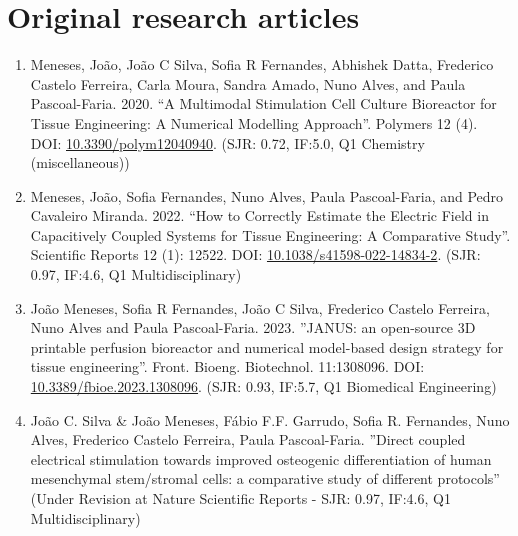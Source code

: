 \section{Original research articles}
\begin{enumerate}
\item \small Meneses, João, João C Silva, Sofia R Fernandes, Abhishek Datta, Frederico Castelo Ferreira, Carla Moura, Sandra Amado, Nuno Alves, and Paula Pascoal-Faria. 2020. “A Multimodal Stimulation Cell Culture Bioreactor for Tissue Engineering: A Numerical Modelling Approach”. Polymers 12 (4). DOI: \href{https://doi.org/10.3390/polym12040940}{10.3390/polym12040940}. (SJR: 0.72, IF:5.0, Q1 Chemistry (miscellaneous))
\item \small Meneses, João, Sofia Fernandes, Nuno Alves, Paula Pascoal-Faria, and Pedro Cavaleiro Miranda. 2022. “How to Correctly Estimate the Electric Field in Capacitively Coupled Systems for Tissue Engineering: A Comparative Study”. Scientific Reports 12 (1): 12522. DOI: \href{https://doi.org/10.1038/s41598-022-14834-2}{10.1038/s41598-022-14834-2}. (SJR: 0.97, IF:4.6, Q1 Multidisciplinary)
\item \small João Meneses, Sofia R Fernandes, João C Silva, Frederico Castelo Ferreira, Nuno Alves and Paula Pascoal-Faria. 2023. ''JANUS: an open-source 3D printable perfusion bioreactor and numerical model-based design strategy for tissue engineering''. Front. Bioeng. Biotechnol. 11:1308096. DOI: \href{https://doi.org/10.3389/fbioe.2023.1308096}{10.3389/fbioe.2023.1308096}. (SJR: 0.93, IF:5.7, Q1 Biomedical Engineering)
\item \small João C. Silva \& João Meneses, Fábio F.F. Garrudo, Sofia R. Fernandes, Nuno Alves, Frederico Castelo Ferreira, Paula Pascoal-Faria. ''Direct coupled electrical stimulation towards improved osteogenic differentiation of human mesenchymal stem/stromal cells: a comparative study of different protocols'' (Under Revision at Nature Scientific Reports - SJR: 0.97, IF:4.6, Q1 Multidisciplinary)
\end{enumerate}


